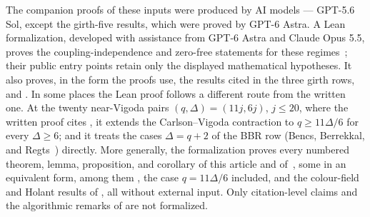 \documentclass[11pt,reqno]{article}
\theoremstyle{plain}
\theoremstyle{definition}
\theoremstyle{remark}
\theoremstyle{definition}
\theoremstyle{remark}
\newcommand{\Deg}{\Delta}                        %
\begin{document}
The companion proofs of these inputs were produced by AI models ---
GPT-5.6 Sol, except the girth-five results, which were proved by GPT-6
Astra.  A Lean formalization, developed with assistance from GPT-6
Astra and Claude Opus 5.5, proves the
coupling-independence and zero-free statements for these regimes~\cite{ShaoShi2026FurtherPotts};
their public entry points retain only the displayed mathematical hypotheses.
It also proves, in the form the proofs use, the results cited in the
three girth rows, \cite[Lemmas~5.13 and~8.7 and Equation~(10)]{CLMM2023}
and \cite[Proposition~2.6(i) and Theorem~2.5]{BencsBerrekkalRegts2025Trees}.
In some places the Lean proof follows a different route from the written
one.  At the twenty near-Vigoda pairs \((q,\Deg)=(11j,6j)\), \(j\le20\),
where the written proof cites \cite[Theorem~20]{CFFGZZ2024}, it extends
the Carlson--Vigoda contraction to \(q\ge11\Deg/6\) for every
\(\Deg\ge6\); and it treats the cases \(\Deg=q+2\) of the BBR row
(Bencs, Berrekkal, and Regts~\cite{BencsBerrekkalRegts2025Trees})
directly.  More generally, the formalization proves every numbered
theorem, lemma, proposition, and corollary of this article and
of~\cite{ShaoShi2026FurtherPotts}, some in an equivalent form, among them
, the case \(q=11\Deg/6\)
included, and the colour-field and Holant results of
, all without external input.
Only citation-level claims and the algorithmic remarks of
 are not formalized.
\end{document}
